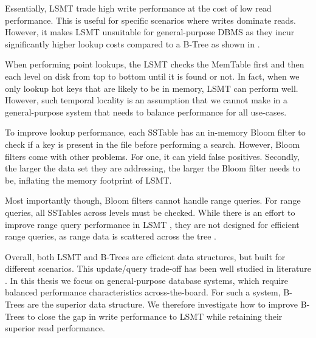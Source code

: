 
Essentially, \ac{LSMT} trade high write performance at the cost of low read performance.
This is useful for specific scenarios where writes dominate reads.
However, it makes \ac{LSMT} unsuitable for general-purpose \ac{DBMS} as they incur significantly higher lookup costs compared to a B-Tree as shown in \cite{gorrod2017wiredtiger}.

When performing point lookups, the \ac{LSMT} checks the MemTable first and then each level on disk from top to bottom until it is found or not.
In fact, when we only lookup hot keys that are likely to be in memory, \ac{LSMT} can perform well.
However, such temporal locality is an assumption that we cannot make in a general-purpose system that needs to balance performance for all use-cases.

To improve lookup performance, each SSTable has an in-memory Bloom filter to check if a key is present in the file before performing a search.
However, Bloom filters come with other problems. 
For one, it can yield false positives.
Secondly, the larger the data set they are addressing, the larger the Bloom filter needs to be, inflating the memory footprint of \ac{LSMT}.

Most importantly though, Bloom filters cannot handle range queries.
For range queries, all SSTables across levels must be checked. 
While there is an effort to improve range query performance in \ac{LSMT} \cite{zhong2021remix}, they are not designed for efficient range queries, as range data is scattered across the tree \cite{sarkar2022lsmt}.

Overall, both \ac{LSMT} and B-Trees are efficient data structures, but built for different scenarios.
This update/query trade-off has been well studied in literature \cite{brodal2003lower}.
In this thesis we focus on general-purpose database systems, which require balanced performance characteristics across-the-board.
For such a system, B-Trees are the superior data structure.
We therefore investigate how to improve B-Trees to close the gap in write performance to \ac{LSMT} while retaining their superior read performance.


